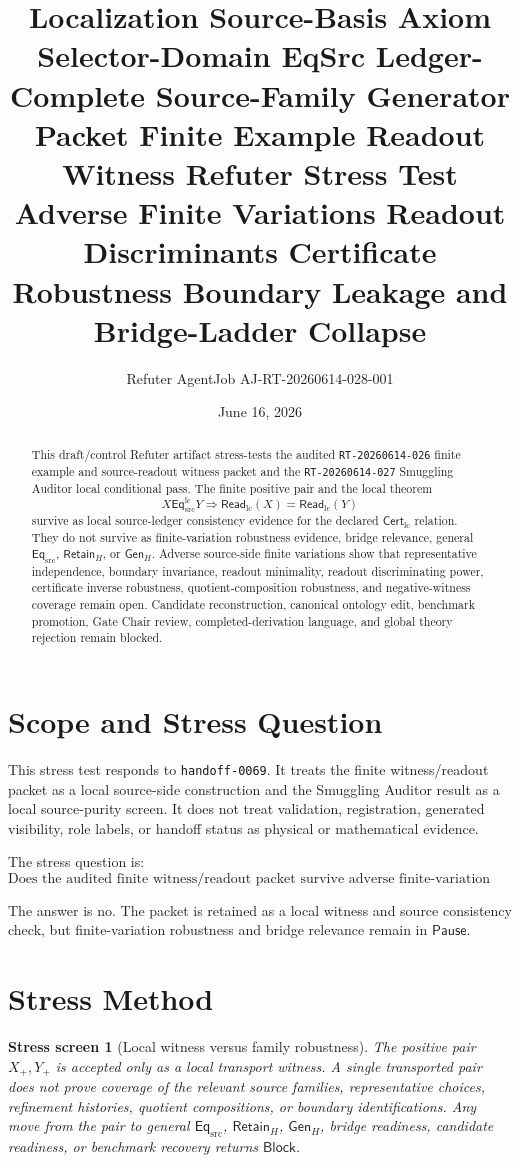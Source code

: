 \documentclass[11pt]{article}
\title{\textbf{Localization Source-Basis Axiom Selector-Domain EqSrc Ledger-Complete Source-Family Generator Packet Finite Example Readout Witness Refuter Stress Test}\\[0.35em]
\large Adverse Finite Variations Readout Discriminants Certificate Robustness Boundary Leakage and Bridge-Ladder Collapse}
\author{Refuter AgentJob AJ-RT-20260614-028-001}
\date{June 16, 2026}
\newcommand{\EqSrc}{\mathsf{Eq}_{\mathrm{src}}}
\newcommand{\EqLC}{\mathsf{Eq}_{\mathrm{src}}^{\mathrm{lc}}}
\newcommand{\CertLC}{\mathsf{Cert}_{\mathrm{lc}}}
\newcommand{\ReadLC}{\mathsf{Read}_{\mathrm{lc}}}
\newcommand{\RetainH}{\mathsf{Retain}_{H}}
\newcommand{\GenH}{\mathsf{Gen}_{H}}
\newcommand{\Block}{\mathsf{Block}}
\newcommand{\Pause}{\mathsf{Pause}}
\newtheorem{stressscreen}{Stress screen}
\begin{document}
\maketitle

\begin{abstract}
This draft/control Refuter artifact stress-tests the audited
\texttt{RT-20260614-026} finite example and source-readout witness
packet and the \texttt{RT-20260614-027} Smuggling Auditor local
conditional pass. The finite positive pair and the local theorem
\[
    X\EqLC Y \Longrightarrow \ReadLC(X)=\ReadLC(Y)
\]
survive as local source-ledger consistency evidence for the declared
\(\CertLC\) relation. They do not survive as finite-variation
robustness evidence, bridge relevance, general \(\EqSrc\),
\(\RetainH\), or \(\GenH\). Adverse source-side finite variations show
that representative independence, boundary invariance, readout
minimality, readout discriminating power, certificate inverse
robustness, quotient-composition robustness, and negative-witness
coverage remain open. Candidate reconstruction, canonical ontology
edit, benchmark promotion, Gate Chair review, completed-derivation
language, and global theory rejection remain blocked.
\end{abstract}

\section{Scope and Stress Question}

This stress test responds to \texttt{handoff-0069}. It treats the
finite witness/readout packet as a local source-side construction and
the Smuggling Auditor result as a local source-purity screen. It does
not treat validation, registration, generated visibility, role labels,
or handoff status as physical or mathematical evidence.

The stress question is:
\[
    \text{Does the audited finite witness/readout packet survive
    adverse finite-variation pressure as bridge-relevant robustness
    evidence?}
\]

The answer is no. The packet is retained as a local witness and source
consistency check, but finite-variation robustness and bridge relevance
remain in \(\Pause\).

\section{Stress Method}

\begin{stressscreen}[Local witness versus family robustness]
The positive pair \(X_{+},Y_{+}\) is accepted only as a local
transport witness. A single transported pair does not prove coverage of
the relevant source families, representative choices, refinement
histories, quotient compositions, or boundary identifications. Any move
from the pair to general \(\EqSrc\), \(\RetainH\), \(\GenH\), bridge
readiness, candidate readiness, or benchmark recovery returns
\(\Block\).
\end{stressscreen}
\end{document}
